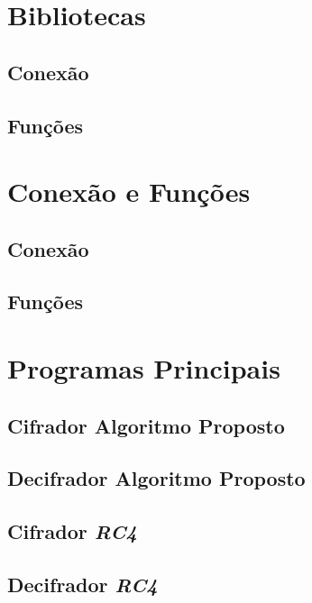 \section{Bibliotecas}
\subsection{Conexão}

\subsection{Funções}

\section{Conexão e Funções}
\subsection{Conexão}

\subsection{Funções}

\section{Programas Principais}
\subsection{Cifrador Algoritmo Proposto}

\subsection{Decifrador Algoritmo Proposto}

\subsection{Cifrador \textit{RC4}}

\subsection{Decifrador \textit{RC4}}

